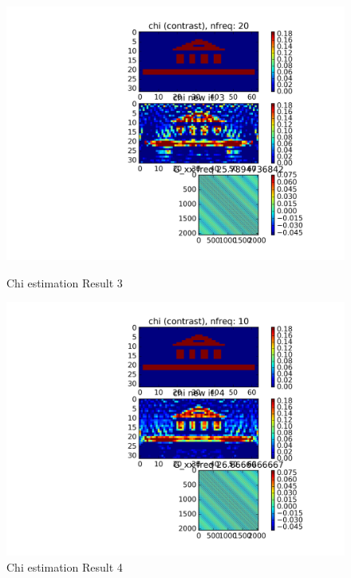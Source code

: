 \documentclass[10pt,a4paper]{article}
\begin{document}
\begin{figure}
\centering
 \includegraphics[scale=0.75]{Chi_est_it02.png}
  \caption{Chi estimation Result 3}
  \label{fig:fig6}
 \includegraphics[scale=0.75]{Chi_est_it03.png}
  \caption{Chi estimation Result 4}
  \label{fig:fig7}
\end{figure}
\end{document}
